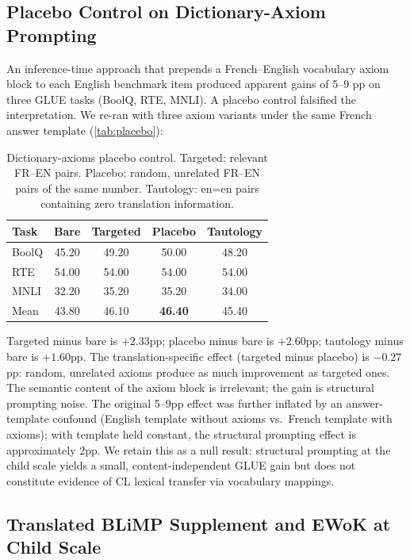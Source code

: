 \documentclass[11pt]{article}
\begin{document}
\subsection{Placebo Control on Dictionary-Axiom Prompting}
\label{sec:placebo}

An inference-time approach that prepends a French--English vocabulary axiom block to each English benchmark item produced apparent gains of 5--9 pp on three GLUE tasks (BoolQ, RTE, MNLI). A placebo control falsified the interpretation. We re-ran with three axiom variants under the same French answer template (\autoref{tab:placebo}):

\begin{table}[t]
\centering
\small
\begin{tabular}{lcccc}
\toprule
Task & Bare & Targeted & Placebo & Tautology \\
\midrule
BoolQ & 45.20 & 49.20 & 50.00 & 48.20 \\
RTE   & 54.00 & 54.00 & 54.00 & 54.00 \\
MNLI  & 32.20 & 35.20 & 35.20 & 34.00 \\
\midrule
Mean  & 43.80 & 46.10 & \textbf{46.40} & 45.40 \\
\bottomrule
\end{tabular}%
\caption{Dictionary-axioms placebo control. Targeted: relevant FR--EN pairs. Placebo: random, unrelated FR--EN pairs of the same number. Tautology: en=en pairs containing zero translation information.}
\label{tab:placebo}
\vspace{-1.5em}
\end{table}

\noindent Targeted minus bare is $+2.33$pp; placebo minus bare is $+2.60$pp; tautology minus bare is $+1.60$pp. The translation-specific effect (targeted minus placebo) is $-0.27$ pp: random, unrelated axioms produce as much improvement as targeted ones. The semantic content of the axiom block is irrelevant; the gain is structural prompting noise. The original 5--9pp effect was further inflated by an answer-template confound (English template without axioms vs.\ French template with axioms); with template held constant, the structural prompting effect is approximately 2pp. We retain this as a null result: structural prompting at the child scale yields a small, content-independent GLUE gain but does not constitute evidence of CL lexical transfer via vocabulary mappings.

\subsection{Translated BLiMP Supplement and EWoK at Child Scale}
\label{sec:blimp-sup}
\label{sec:ewok}
\end{document}
